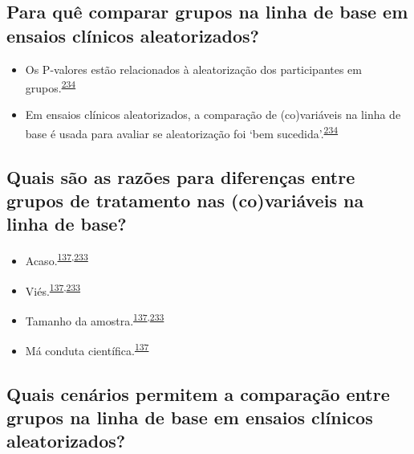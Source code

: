 \documentclass[
  a4paper,
]{book}
\begin{document}
\hypertarget{para-quuxea-comparar-grupos-na-linha-de-base-em-ensaios-cluxednicos-aleatorizados}{%
\subsection{Para quê comparar grupos na linha de base em ensaios clínicos aleatorizados?}\label{para-quuxea-comparar-grupos-na-linha-de-base-em-ensaios-cluxednicos-aleatorizados}}

\begin{itemize}
\item
  Os P-valores estão relacionados à aleatorização dos participantes em grupos.\textsuperscript{\protect\hyperlink{ref-Bolzern2019}{234}}
\item
  Em ensaios clínicos aleatorizados, a comparação de (co)variáveis na linha de base é usada para avaliar se aleatorização foi `bem sucedida'.\textsuperscript{\protect\hyperlink{ref-Bolzern2019}{234}}
\end{itemize}

\hypertarget{quais-suxe3o-as-razuxf5es-para-diferenuxe7as-entre-grupos-de-tratamento-nas-covariuxe1veis-na-linha-de-base}{%
\subsection{Quais são as razões para diferenças entre grupos de tratamento nas (co)variáveis na linha de base?}\label{quais-suxe3o-as-razuxf5es-para-diferenuxe7as-entre-grupos-de-tratamento-nas-covariuxe1veis-na-linha-de-base}}

\begin{itemize}
\item
  Acaso.\textsuperscript{\protect\hyperlink{ref-chen2020}{137},\protect\hyperlink{ref-Stang2018}{233}}
\item
  Viés.\textsuperscript{\protect\hyperlink{ref-chen2020}{137},\protect\hyperlink{ref-Stang2018}{233}}
\item
  Tamanho da amostra.\textsuperscript{\protect\hyperlink{ref-chen2020}{137},\protect\hyperlink{ref-Stang2018}{233}}
\item
  Má conduta científica.\textsuperscript{\protect\hyperlink{ref-chen2020}{137}}
\end{itemize}

\hypertarget{quais-cenuxe1rios-permitem-a-comparauxe7uxe3o-entre-grupos-na-linha-de-base-em-ensaios-cluxednicos-aleatorizados}{%
\subsection{Quais cenários permitem a comparação entre grupos na linha de base em ensaios clínicos aleatorizados?}\label{quais-cenuxe1rios-permitem-a-comparauxe7uxe3o-entre-grupos-na-linha-de-base-em-ensaios-cluxednicos-aleatorizados}}
\end{document}
